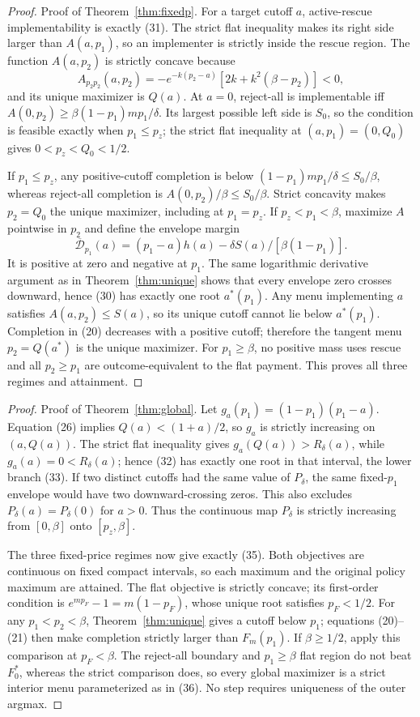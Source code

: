 \documentclass[mnsc,blindrev]{informs3}
\begin{document}
\begin{proof}{Proof of Theorem~\ref{thm:fixedp}.}
For a target cutoff $a$, active-rescue implementability is exactly (31).
The strict flat inequality makes its right side larger than $A(a,p_1)$, so an
implementer is strictly inside the rescue region.  The function $A(a,p_2)$ is
strictly concave because
\[
 A_{p_2p_2}(a,p_2)
 =-e^{-k(p_2-a)}[2k+k^2(\beta-p_2)]<0,
\]
and its unique maximizer is $Q(a)$.  At $a=0$, reject-all is implementable
iff $A(0,p_2)\ge\beta(1-p_1)mp_1/\delta$.  Its largest possible left side is
$S_0$, so the condition is feasible exactly when $p_1\le p_z$; the strict flat
inequality at $(a,p_1)=(0,Q_0)$ gives $0<p_z<Q_0<1/2$.

If $p_1\le p_z$, any positive-cutoff completion is below
$(1-p_1)mp_1/\delta\le S_0/\beta$, whereas reject-all completion is
$A(0,p_2)/\beta\le S_0/\beta$.
Strict concavity makes $p_2=Q_0$ the unique maximizer, including at
$p_1=p_z$.  If $p_z<p_1<\beta$, maximize $A$ pointwise in $p_2$ and define the envelope
margin
\[
 \overline{\mathcal D}_{p_1}(a)
 =(p_1-a)h(a)-\delta S(a)/[\beta(1-p_1)].
\]
It is positive at zero and negative at $p_1$.  The same logarithmic derivative
argument as in Theorem~\ref{thm:unique} shows that every envelope zero crosses
downward, hence (30) has exactly one root $a^*(p_1)$.  Any menu implementing
$a$ satisfies $A(a,p_2)\le S(a)$, so its unique cutoff cannot lie below
$a^*(p_1)$.  Completion in (20) decreases with a positive cutoff; therefore
the tangent menu $p_2=Q(a^*)$ is the unique maximizer.  For $p_1\ge\beta$, no
positive mass uses rescue and all $p_2\ge p_1$ are outcome-equivalent to the flat
payment.  This proves all three regimes and attainment.
\Halmos\end{proof}

\begin{proof}{Proof of Theorem~\ref{thm:global}.}
Let $g_a(p_1)=(1-p_1)(p_1-a)$.  Equation (26) implies
$Q(a)<(1+a)/2$, so $g_a$ is strictly increasing on $(a,Q(a))$.  The strict
flat inequality gives $g_a(Q(a))>R_\delta(a)$, while
$g_a(a)=0<R_\delta(a)$; hence (32)
has exactly one root in that interval, the lower branch (33).  If two
distinct cutoffs had the same value of $P_\delta$, the same fixed-$p_1$
envelope would have two downward-crossing zeros.  This also excludes
$P_\delta(a)=P_\delta(0)$ for $a>0$.  Thus the continuous map $P_\delta$ is strictly increasing from
$[0,\beta]$ onto $[p_z,\beta]$.

The three fixed-price regimes now give exactly (35).  Both objectives are
continuous on fixed compact intervals, so each maximum and the original
policy maximum are attained.  The flat objective is strictly concave; its
first-order condition is $e^{mp_F}-1=m(1-p_F)$, whose unique root satisfies
$p_F<1/2$.  For any $p_1<p_2<\beta$, Theorem~\ref{thm:unique} gives a cutoff
below $p_1$; equations (20)--(21) then make completion strictly larger than
$F_m(p_1)$.  If $\beta\ge1/2$, apply this comparison at $p_F<\beta$.
The reject-all boundary and $p_1\ge\beta$ flat region do not beat $F_0^*$,
whereas the strict comparison does, so every global maximizer is a strict
interior menu parameterized as in (36).  No step requires uniqueness of the
outer argmax.
\Halmos\end{proof}
\end{document}
